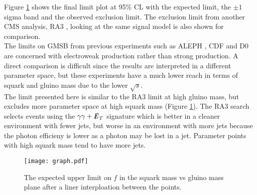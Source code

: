Figure \ref{fig:finallimit} shows the final limit plot at 95\% CL with the
expected limit, the $\pm1$ sigma band and the observed exclusion limit. The
exclusion limit from another CMS analysis, RA3 \cite{ra3}, looking at the same 
signal model is also shown for comparison. \\

The limits on GMSB from previous experiments such as ALEPH \cite{aleph}, CDF
\cite{cdf} and D0 \cite{d0} are concerned with electroweak production rather than 
strong production. A direct comparison is difficult since the results are 
interpreted in a different parameter space, but these experiments have a much 
lower reach in terms of squark and gluino mass due to the lower $\sqrt{s}$. \\

The limit presented here is similar to the RA3 limit at high gluino mass, but 
excludes more parameter space at high squark mass (Figure \ref{fig:finallimit}).
The RA3 search selects events using the $\gamma\gamma+\slashed{E}_{T}$ signature which is 
better in a cleaner environment with fewer jets, but worse in an environment 
with more jets because the photon efficieny is lower as a photon may be lost in
a jet. Parameter points with high squark mass tend to have more jets.

\begin{figure}
\begin{center}
\texttt{[image: graph.pdf]}
\end{center}
\caption{The expected upper limit on $f$ in the squark mass vs gluino mass plane 
after a liner interploation between the points. }
\label{fig:finallimit}
\end{figure}

